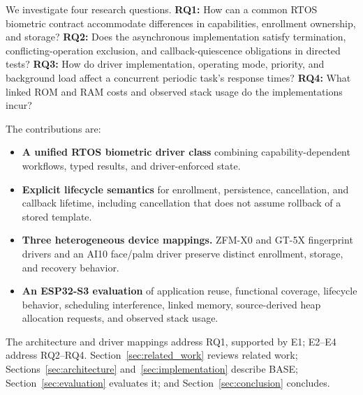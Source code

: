 We investigate four research questions. \textbf{RQ1:} How can a common RTOS biometric contract accommodate differences in capabilities, enrollment ownership, and storage? \textbf{RQ2:} Does the asynchronous implementation satisfy termination, conflicting-operation exclusion, and callback-quiescence obligations in directed tests? \textbf{RQ3:} How do driver implementation, operating mode, priority, and background load affect a concurrent periodic task's response times? \textbf{RQ4:} What linked ROM and RAM costs and observed stack usage do the implementations incur?

The contributions are:
\begin{itemize}
    \item \textbf{A unified RTOS biometric driver class} combining capability-dependent workflows, typed results, and driver-enforced state.
    \item \textbf{Explicit lifecycle semantics} for enrollment, persistence, cancellation, and callback lifetime, including cancellation that does not assume rollback of a stored template.
    \item \textbf{Three heterogeneous device mappings.} ZFM-X0 and GT-5X fingerprint drivers and an AI10 face/palm driver preserve distinct enrollment, storage, and recovery behavior.
    \item \textbf{An ESP32-S3 evaluation} of application reuse, functional coverage, lifecycle behavior, scheduling interference, linked memory, source-derived heap allocation requests, and observed stack usage.
\end{itemize}

The architecture and driver mappings address RQ1, supported by E1; E2--E4 address RQ2--RQ4. Section~\ref{sec:related_work} reviews related work; Sections~\ref{sec:architecture} and~\ref{sec:implementation} describe BASE; Section~\ref{sec:evaluation} evaluates it; and Section~\ref{sec:conclusion} concludes.